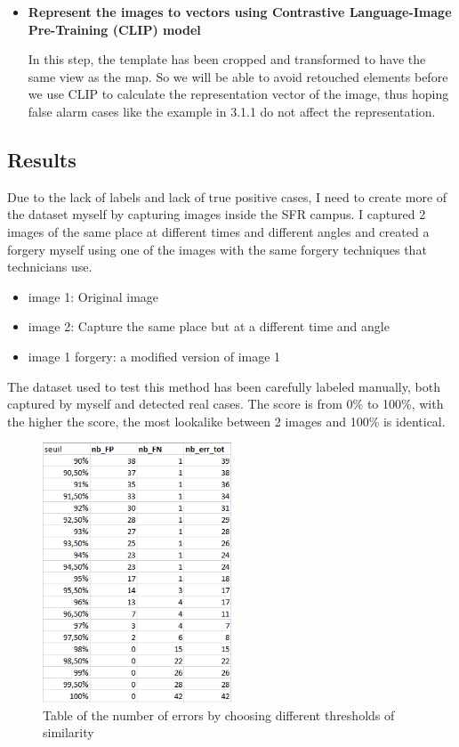 \begin{itemize}
    \item \textbf{Represent the images to vectors using Contrastive Language-Image Pre-Training (CLIP) model}

In this step, the template has been cropped and transformed to have the same view as the map. So we will be able to avoid retouched elements before we use CLIP\cite{pmlr-v139-radford21a} to calculate the representation vector of the image, thus hoping false alarm cases like the example in 3.1.1 do not affect the representation.
    
\end{itemize}

\subsection{Results}

Due to the lack of labels and lack of true positive cases, I need to create more of the dataset myself by capturing images inside the SFR campus. I captured 2 images of the same place at different times and different angles and created a forgery myself using one of the images with the same forgery techniques that technicians use.

\begin{itemize}
    \item image 1: Original image
    \item image 2: Capture the same place but at a different time and angle
    \item image 1 forgery: a modified version of image 1
\end{itemize}

The dataset used to test this method has been carefully labeled manually, both captured by myself and detected real cases. The score is from 0\% to 100\%, with the higher the score, the most lookalike between 2 images and 100\% is identical.

\begin{figure}[H]
    \centering
    \includegraphics[width=0.5\textwidth]{images/cas_2_confusion_matrix.png}
    \caption{Table of the number of errors by choosing different thresholds of similarity}
    \label{fig:clip_threshold}
\end{figure}



